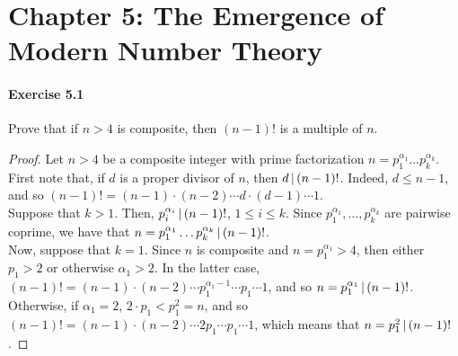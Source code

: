 \section*{Chapter 5: The Emergence of Modern Number Theory}

\paragraph{Exercise 5.1}
Prove that if $n > 4$ is composite, then $(n-1)!$ is a multiple of $n$.

\begin{proof}
Let $n > 4$ be a composite integer with prime factorization
$n = p_1^{\alpha_1} \dots p_k^{\alpha_k}$. First note that, if $d$ is a 
proper divisor of $n$, then $d \, | \, (n-1)!$. Indeed, $d \leq n-1$,
and so $(n-1)! = (n-1) \cdot (n-2) \cdots d \cdot (d-1) \cdots 1$. \\

Suppose that $k > 1$. Then, $p_i^{\alpha_i} \, | \, (n-1)!$,
$1 \leq i \leq k$. Since $p_1^{\alpha_1}, \dots, p_k^{\alpha_k}$ are
pairwise coprime, we have that
$n = p_1^{\alpha_1} \dots p_k^{\alpha_k} \, | \, (n-1)!$.\\

Now, suppose that $k = 1$. Since
$n$ is composite and $n = p_1^{\alpha_1} > 4$, then either $p_1 > 2$ or
otherwise $\alpha_1 > 2$. In the latter case, 
$(n-1)! = (n-1) \cdot (n-2) \cdots p_1^{\alpha_1 - 1} \cdots p_1 \cdots 1$,
and so $n = p_1^{\alpha_1} \, | \, (n-1)!$. Otherwise, if $\alpha_1 = 2$,
$2 \cdot p_1 < p_1^2 = n$, and so
$(n-1)! = (n-1) \cdot (n-2) \cdots 2p_1 \cdots p_1 \cdots 1$, which means 
that $n = p_1^{2} \, | \, (n-1)!$.
\end{proof}
